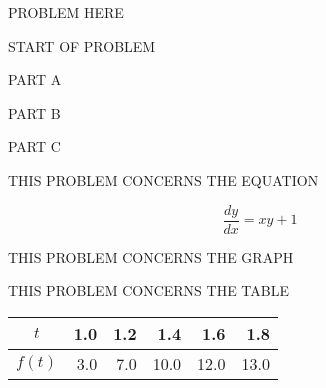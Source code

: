 \vfill \vfill \vfill

\clearpage




\begin{problem}{0}
PROBLEM HERE    
\vfill \vfill
\end{problem}


\begin{problem}{0}
START OF PROBLEM
\vspace{1pc}

PART A
\vfill

PART B
\vfill

PART C
\vfill
\end{problem}


\clearpage




\begin{problem}{0}
THIS PROBLEM CONCERNS THE EQUATION

$$ \frac{dy}{dx} = xy + 1 $$

\vfill
\end{problem}


\begin{problem}{0}
THIS PROBLEM CONCERNS THE GRAPH

\begin{center}
\end{center}

\vfill
\end{problem}


\clearpage




\begin{problem}{0}
THIS PROBLEM CONCERNS THE TABLE

\begin{table}[h] 
\begin{center}
\addtolength{\tabcolsep}{1mm}
\renewcommand{\arraystretch}{1.2}
\begin{tabular}{|c|r|r|r|r|r|}
\hline
\hline
$t$    & \phantom{0}1.0 & \phantom{0}1.2 
                   &  1.4 &  1.6 &  1.8 \\
\hline
$f(t)$ & 3.0 & 7.0 & 10.0 & 12.0 & 13.0 \\
\hline
\hline
\end{tabular}
\end{center}
\end{table}

\vfill
\end{problem}



